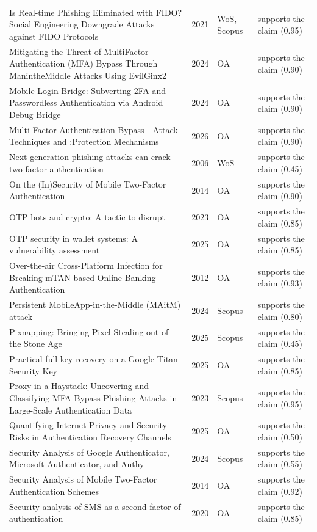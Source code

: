 \begin{longtable}{@{}%
  >{\raggedright\arraybackslash}p{}c%
  >{\raggedright\arraybackslash}p{}%
  >{\raggedright\arraybackslash}p{}@{}}
Is Real-time Phishing Eliminated with FIDO? Social Engineering Downgrade Attacks against FIDO Protocols & 2021 & WoS, Scopus & supports the claim (0.95) \\
Mitigating the Threat of MultiFactor Authentication (MFA) Bypass Through ManintheMiddle Attacks Using EvilGinx2 & 2024 & OA & supports the claim (0.90) \\
Mobile Login Bridge: Subverting 2FA and Passwordless Authentication via Android Debug Bridge & 2024 & OA & supports the claim (0.90) \\
Multi-Factor Authentication Bypass - Attack Techniques and :Protection Mechanisms & 2026 & OA & supports the claim (0.90) \\
Next-generation phishing attacks can crack two-factor authentication & 2006 & WoS & supports the claim (0.45) \\
On the (In)Security of Mobile Two-Factor Authentication & 2014 & OA & supports the claim (0.90) \\
OTP bots and crypto: A tactic to disrupt & 2023 & OA & supports the claim (0.85) \\
OTP security in wallet systems: A vulnerability assessment & 2025 & OA & supports the claim (0.85) \\
Over-the-air Cross-Platform Infection for Breaking mTAN-based Online Banking Authentication & 2012 & OA & supports the claim (0.93) \\
Persistent MobileApp-in-the-Middle (MAitM) attack & 2024 & Scopus & supports the claim (0.80) \\
Pixnapping: Bringing Pixel Stealing out of the Stone Age & 2025 & Scopus & supports the claim (0.45) \\
Practical full key recovery on a Google Titan Security Key & 2025 & OA & supports the claim (0.85) \\
Proxy in a Haystack: Uncovering and Classifying MFA Bypass Phishing Attacks in Large-Scale Authentication Data & 2023 & Scopus & supports the claim (0.95) \\
Quantifying Internet Privacy and Security Risks in Authentication Recovery Channels & 2025 & OA & supports the claim (0.50) \\
Security Analysis of Google Authenticator, Microsoft Authenticator, and Authy & 2024 & Scopus & supports the claim (0.55) \\
Security Analysis of Mobile Two-Factor Authentication Schemes & 2014 & OA & supports the claim (0.92) \\
Security analysis of SMS as a second factor of authentication & 2020 & OA & supports the claim (0.85) \\

\end{longtable}
